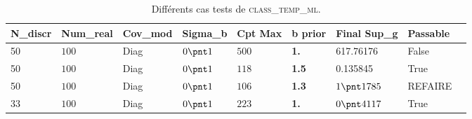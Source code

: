 \documentclass[a4paper,10pt]{article}
\newcommand\bk{\color{black}}
\newcommand{\dgreen}{\color{dgreen}}
\newcommand\red{\color{red}}
\numberwithin{equation}{section} %
\begin{document}
\begin{table}[h]
		\centering
		\begin{tabular}{|M{1.6cm}|M{1.7cm}|M{1.7cm}|M{1.7cm}|M{1.7cm}|M{1.5cm} |M{2.1cm}|M{1.7cm}|N }
		\hline
		N\_discr & Num\_real & Cov\_mod & Sigma\_b & Cpt Max & \textbf{b prior}& Final Sup\_g&Passable&\\[.5cm] \hline
		
		50 & $100$ & Diag & $0 \pnt 1 $ & $500$ & \textbf{1.} & 617.76176 &  \red False \bk &\\[1cm] \hline 

		50 & $100$ & Diag & $0 \pnt 1 $ & $118$ & \textbf{1.5} \bk & 0.135845 & True&\\[1cm] \hline		
		
		50 & $100$ & Diag & $0 \pnt 1 $ & $106$ & \textbf{1.3}& $1\pnt1785$&REFAIRE &\\[1cm] \hline

		\dgreen 33 \bk & $100$ & Diag & $0 \pnt 1 $ & $223$ & \textbf{1.}& $0\pnt4117$&True &\\[1cm] \hline
		\end{tabular} 
		\vspace{0.5cm}
		\caption{Différents cas tests de \textsc{class\_temp\_ml}. 
		\label{tab:simParameters}}		

\end{table}

\pagebreak 
\end{document}
